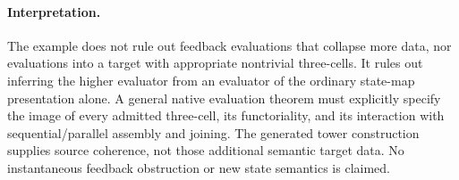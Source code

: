 \documentclass{article}
\begin{document}
\paragraph{Interpretation.} The example does not rule out feedback evaluations that collapse more data, nor evaluations into a target with appropriate nontrivial three-cells. It rules out inferring the higher evaluator from an evaluator of the ordinary state-map presentation alone. A general native evaluation theorem must explicitly specify the image of every admitted three-cell, its functoriality, and its interaction with sequential/parallel assembly and joining. The generated tower construction supplies source coherence, not those additional semantic target data. No instantaneous feedback obstruction or new state semantics is claimed.
\end{document}
